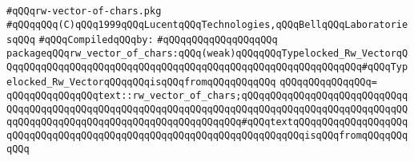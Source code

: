 \label{src/lib/std/rw-vector-of-chars.pkg}
\verb|#qQQqrw-vector-of-chars.pkg|\newline
\verb|#qQQqqQQq(C)qQQq1999qQQqLucentqQQqTechnologies,qQQqBellqQQqLaboratoriesqQQq|\newline
\newline
\verb|#qQQqCompiledqQQqby:|\newline
\verb|#qQQqqQQqqQQqqQQqqQQq|\newline
\newline
\verb|packageqQQqrw_vector_of_chars:qQQq(weak)qQQqqQQqTypelocked_Rw_VectorqQQqqQQqqQQqqQQqqQQqqQQqqQQqqQQqqQQqqQQqqQQqqQQqqQQqqQQqqQQqqQQq#qQQqTypelocked_Rw_VectorqQQqqQQqisqQQqfromqQQqqQQqqQQq|\newline
\verb|qQQqqQQqqQQqqQQq=|\newline
\verb|qQQqqQQqqQQqqQQqtext::rw_vector_of_chars;qQQqqQQqqQQqqQQqqQQqqQQqqQQqqQQqqQQqqQQqqQQqqQQqqQQqqQQqqQQqqQQqqQQqqQQqqQQqqQQqqQQqqQQqqQQqqQQqqQQqqQQqqQQqqQQqqQQqqQQqqQQqqQQqqQQqqQQqqQQq#qQQqtextqQQqqQQqqQQqqQQqqQQqqQQqqQQqqQQqqQQqqQQqqQQqqQQqqQQqqQQqqQQqqQQqqQQqqQQqisqQQqfromqQQqqQQqqQQq|\newline
\newline

